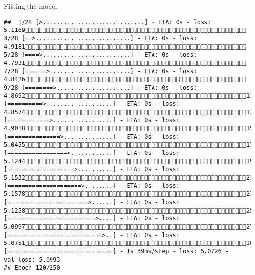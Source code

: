 \documentclass[
  ignorenonframetext,
]{beamer}
\begin{document}
\begin{frame}[fragile]{Fitting the model}
\begin{verbatim}
##  1/28 [>.............................] - ETA: 0s - loss: 5.1169 3/28 [==>...........................] - ETA: 0s - loss: 4.9181 5/28 [====>.........................] - ETA: 0s - loss: 4.7931 7/28 [======>.......................] - ETA: 0s - loss: 4.8426 9/28 [========>.....................] - ETA: 0s - loss: 4.869211/28 [==========>...................] - ETA: 0s - loss: 4.857413/28 [============>.................] - ETA: 0s - loss: 4.901815/28 [===============>..............] - ETA: 0s - loss: 5.045517/28 [=================>............] - ETA: 0s - loss: 5.124419/28 [===================>..........] - ETA: 0s - loss: 5.153221/28 [=====================>........] - ETA: 0s - loss: 5.157823/28 [=======================>......] - ETA: 0s - loss: 5.125825/28 [=========================>....] - ETA: 0s - loss: 5.099727/28 [===========================>..] - ETA: 0s - loss: 5.075128/28 [==============================] - 1s 39ms/step - loss: 5.0726 - val_loss: 5.0993
## Epoch 120/250

\end{verbatim}
\end{frame}
\end{document}
